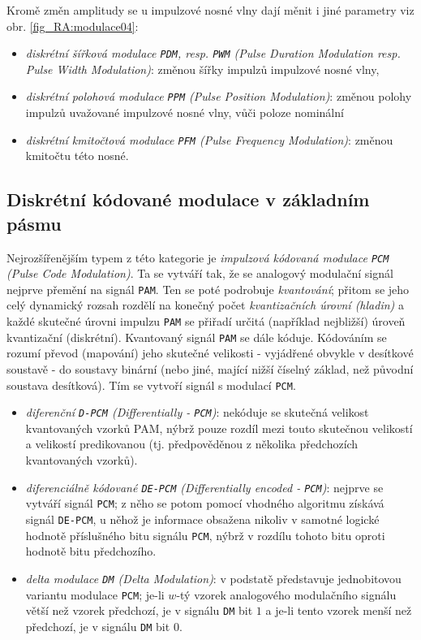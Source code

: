       Kromě změn amplitudy se u impulzové nosné vlny dají měnit i jiné parametry viz obr. 
      \ref{fig_RA:modulace04}:
      \begin{itemize}
        \item \emph{diskrétní šířková modulace \texttt{PDM}, resp. \texttt{PWM} (Pulse Duration  
              Modulation resp. Pulse Width Modulation)}: změnou šířky impulzů impulzové nosné vlny,
        \item \emph{diskrétní polohová modulace \texttt{PPM} (Pulse Position Modulation)}: změnou  
              polohy impulzů uvažované impulzové nosné vlny, vůči poloze nominální
        \item \emph{diskrétní kmitočtová modulace \texttt{PFM} (Pulse Frequency Modulation)}:  
              změnou kmitočtu této nosné.
      \end{itemize} 
    \subsection{Diskrétní kódované modulace v základním pásmu}
      Nejrozšířenějším typem z této kategorie je \emph{impulzová kódovaná modulace \texttt{PCM} 
      (Pulse Code Modulation)}. Ta se vytváří tak, že se analogový modulační signál nejprve přemění 
      na signál \texttt{PAM}. Ten se poté podrobuje \emph{kvantování}; přitom se jeho celý 
      dynamický rozsah rozdělí na konečný počet \emph{kvantizačních úrovní (hladin)} a každé 
      skutečné úrovni impulzu \texttt{PAM} se přiřadí určitá (například nejbližší) úroveň 
      kvantizační (diskrétní). Kvantovaný signál \texttt{PAM} se dále kóduje. Kódováním se rozumí 
      převod (mapování) jeho skutečné velikosti - vyjádřené obvykle v desítkové soustavě - do 
      soustavy binární (nebo jiné, mající nižší číselný základ, než původní soustava desítková). 
      Tím se vytvoří signál s modulací \texttt{PCM}.
      \begin{itemize}
        \item \emph{diferenční \texttt{D-PCM} (Differentially - \texttt{PCM})}: nekóduje se 
              skutečná velikost kvantovaných vzorků PAM, nýbrž pouze rozdíl mezi touto skutečnou 
              velikostí a velikostí predikovanou (tj. předpověděnou z několika předchozích 
              kvantovaných vzorků).
        \item \emph{diferenciálně kódované \texttt{DE-PCM} (Differentially encoded -
              \texttt{PCM})}: nejprve se vytváří signál \texttt{PCM}; z něho se potom pomocí 
              vhodného algoritmu získává signál \texttt{DE-PCM}, u něhož je informace obsažena 
              nikoliv v samotné logické hodnotě příslušného bitu signálu \texttt{PCM}, nýbrž v 
              rozdílu tohoto bitu oproti hodnotě bitu předchozího.
        \item \emph{delta modulace \texttt{DM} (Delta Modulation)}: v podstatě představuje   
              jednobitovou variantu modulace \texttt{PCM}; je-li \(w\)-tý vzorek analogového 
              modulačního signálu větší než vzorek předchozí, je v signálu \texttt{DM} bit \(1\) a 
              je-li tento vzorek menší než předchozí, je v signálu \texttt{DM} bit \(0\).
      \end{itemize}
      
